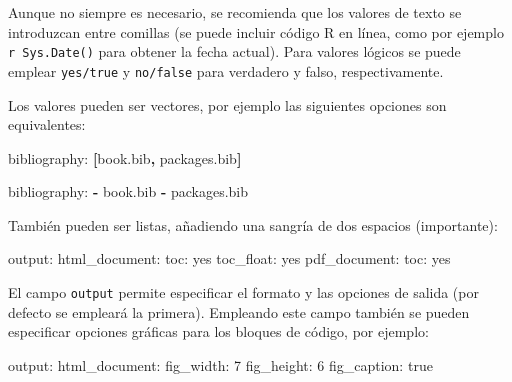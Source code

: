 \documentclass[]{book}
\newenvironment{Shaded}{\begin{snugshade}}{\end{snugshade}}
\newcommand{\KeywordTok}[1]{\textcolor[rgb]{0.13,0.29,0.53}{\textbf{#1}}}
\newcommand{\FunctionTok}[1]{\textcolor[rgb]{0.00,0.00,0.00}{#1}}
\newcommand{\AttributeTok}[1]{\textcolor[rgb]{0.77,0.63,0.00}{#1}}
\newcommand{\NormalTok}[1]{#1}
\theoremstyle{definition}
\theoremstyle{definition}
\theoremstyle{definition}
\theoremstyle{remark}
\begin{document}
Aunque no siempre es necesario, se recomienda que los valores de texto
se introduzcan entre comillas (se puede incluir código R en línea, como
por ejemplo \texttt{\textasciigrave{}r\ Sys.Date()\textasciigrave{}}
para obtener la fecha actual). Para valores lógicos se puede emplear
\texttt{yes/true} y \texttt{no/false} para verdadero y falso,
respectivamente.

Los valores pueden ser vectores, por ejemplo las siguientes opciones son
equivalentes:

\begin{Shaded}
\begin{Highlighting}[]
\FunctionTok{bibliography:}\AttributeTok{ }\KeywordTok{[}\NormalTok{book.bib}\KeywordTok{,}\NormalTok{ packages.bib}\KeywordTok{]}
\end{Highlighting}
\end{Shaded}

\begin{Shaded}
\begin{Highlighting}[]
\FunctionTok{bibliography:}
\KeywordTok{-}\NormalTok{ book.bib}
\KeywordTok{-}\NormalTok{ packages.bib}
\end{Highlighting}
\end{Shaded}

También pueden ser listas, añadiendo una sangría de dos espacios
(importante):

\begin{Shaded}
\begin{Highlighting}[]
\FunctionTok{output:}
  \FunctionTok{html_document:}
    \FunctionTok{toc:}\AttributeTok{ yes}
    \FunctionTok{toc_float:}\AttributeTok{ yes}
  \FunctionTok{pdf_document:}
    \FunctionTok{toc:}\AttributeTok{ yes}
\end{Highlighting}
\end{Shaded}

El campo \texttt{output} permite especificar el formato y las opciones
de salida (por defecto se empleará la primera). Empleando este campo
también se pueden especificar opciones gráficas para los bloques de
código, por ejemplo:

\begin{Shaded}
\begin{Highlighting}[]
\FunctionTok{output:}
  \FunctionTok{html_document:}
    \FunctionTok{fig_width:}\AttributeTok{ 7}
    \FunctionTok{fig_height:}\AttributeTok{ 6}
    \FunctionTok{fig_caption:}\AttributeTok{ true}
\end{Highlighting}
\end{Shaded}
\end{document}
